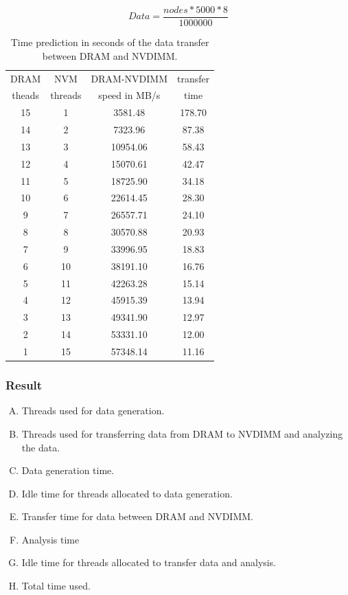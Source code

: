 \documentclass[12pt,a4paper,USenglish]{article}      %
\begin{document}
\begin{equation}
	Data = \frac{nodes*5000*8}{1000000}
\end{equation}
\begin{table}[!hbtp]
\centering
\begin{tabular}{ |c|c|c|c| } 
\hline
DRAM & NVM & DRAM-NVDIMM & transfer \\
theads & threads & speed in MB/s & time \\
\hline
15 & 1 & 3581.48 & 178.70 \\
\hline
14 & 2 & 7323.96 & 87.38 \\
\hline
13 & 3 & 10954.06 & 58.43 \\
\hline
12 & 4 & 15070.61 & 42.47 \\
\hline
11 & 5 & 18725.90 & 34.18 \\
\hline
10 & 6 & 22614.45 & 28.30 \\
\hline
9 & 7 & 26557.71 & 24.10 \\
\hline
8 & 8 & 30570.88 & 20.93 \\
\hline
7 & 9 & 33996.95 & 18.83 \\
\hline
6 & 10 & 38191.10 & 16.76 \\
\hline
5 & 11 & 42263.28 & 15.14 \\
\hline
4 & 12 & 45915.39 & 13.94 \\
\hline
3 & 13 & 49341.90 & 12.97 \\
\hline
2 & 14 & 53331.10 & 12.00 \\
\hline
1 & 15 & 57348.14 & 11.16 \\
\hline
\end{tabular}
\caption{Time prediction in seconds of the data transfer between DRAM and NVDIMM.}
\label{tab:nvmPredictions}
\end{table}

\pagebreak
\subsubsection{Result}
\begin{enumerate}[A.]
\item Threads used for data generation.
\item Threads used for transferring data from DRAM to NVDIMM and analyzing the data.
\item Data generation time.
\item Idle time for threads allocated to data generation.
\item Transfer time for data between DRAM and NVDIMM.
\item Analysis time
\item Idle time for threads allocated to transfer data and analysis.
\item Total time used.
\end{enumerate}
\end{document}
